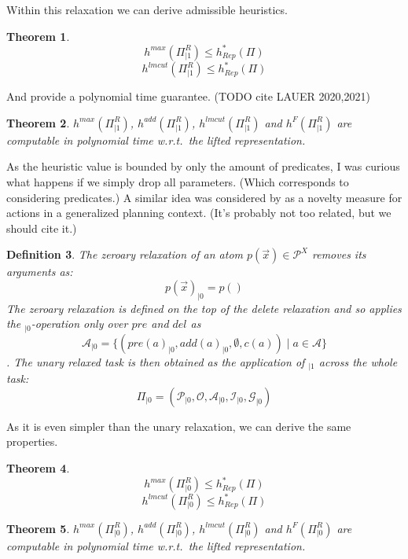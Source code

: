 \documentclass[twocolumn]{article}
\newcommand{\task}{\ensuremath{\Pi}\xspace}
\newcommand{\preds}{\ensuremath{\mathcal{P}}\xspace}
\newcommand{\acts}{\ensuremath{\mathcal{A}}\xspace}
\newcommand{\objects}{\ensuremath{\mathcal{O}}\xspace}
\newcommand{\init}{\ensuremath{\mathcal{I}}\xspace}
\newcommand{\goal}{\ensuremath{\mathcal{G}}\xspace}
\newcommand{\vars}{\ensuremath{X}\xspace}
\newcommand{\someVar}{\ensuremath{x}\xspace}
\newcommand{\atoms}{\ensuremath{\preds^{\vars}}\xspace}
\newcommand{\someAtom}{\ensuremath{p(\vec{\someVar})}\xspace}
\newcommand{\somePred}{\ensuremath{p}\xspace}
\newcommand{\prename}{\ensuremath{pre}\xspace}
\newcommand{\addname}{\ensuremath{add}\xspace}
\newcommand{\delname}{\ensuremath{del}\xspace}
\newcommand{\pre}[1]{\ensuremath{\prename(#1)}\xspace}
\newcommand{\add}[1]{\ensuremath{\addname(#1)}\xspace}
\newcommand{\cost}[1]{\ensuremath{c(#1)}\xspace}
\newcommand{\someAct}{\ensuremath{a}\xspace}
\newcommand{\optimalHeuristic}{\ensuremath{h^{*}_{Rep}}\xspace}
\newcommand{\unary}[1]{\ensuremath{#1_{|1}}\xspace}
\newcommand{\zeroary}[1]{\ensuremath{#1_{|0}}\xspace}
\newtheorem{theorem}{Theorem}
\newtheorem{definition}[theorem]{Definition}
\begin{document}
	Within this relaxation we can derive admissible heuristics.
	
	\begin{theorem}
		$$
			h^{max}(\unary{\task^{R}}) \leq \optimalHeuristic(\task)
		$$
		$$
		h^{lmcut}(\unary{\task^{R}}) \leq \optimalHeuristic(\task)
		$$
	\end{theorem}
	
	And provide a polynomial time guarantee. (TODO cite LAUER 2020,2021)
	
	\begin{theorem}
		$
		h^{max}(\unary{\task^{R}})
		$,
		$
		h^{add}(\unary{\task^{R}})
		$,
		$
		h^{lmcut}(\unary{\task^{R}})
		$
		and 
		$
		h^{F}(\unary{\task^{R}})
		$
		are computable in polynomial time w.r.t.\ the lifted representation.
	\end{theorem}
	
	As the heuristic value is bounded by only the amount of predicates, I was curious what happens if we simply drop all parameters. 
	(Which corresponds to considering predicates.)
	A similar idea was considered by \cite{lei:etal:socs-23} as a novelty measure for actions in a generalized planning context.
	(It's probably not too related, but we should cite it.)
	
	\begin{definition}
		The zeroary relaxation of an atom $\someAtom \in \atoms$ removes its arguments as:
		$$
		\zeroary{\someAtom} =  \somePred()
		$$
		The zeroary relaxation is defined on the top of the delete relaxation and so applies the {$\zeroary{}$}-operation only over \prename and \delname as
		$$
		\zeroary{\acts} = \{(\zeroary{\pre{\someAct}}, \zeroary{\add{\someAct}}, \emptyset, \cost{\someAct}) \mid \someAct \in \acts\}
		$$.
		The unary relaxed task is then obtained as the application of $\unary{}$ across the whole task:
		$$
		\zeroary{\task} = (\zeroary{\preds}, \objects, \zeroary{\acts}, \zeroary{\init}, \zeroary{\goal})
		$$
	\end{definition}
	
	As it is even simpler than the unary relaxation, we can derive the same properties.
	
	\begin{theorem}
		$$
		h^{max}(\zeroary{\task^{R}}) \leq \optimalHeuristic(\task)
		$$
		$$
		h^{lmcut}(\zeroary{\task^{R}}) \leq \optimalHeuristic(\task)
		$$
	\end{theorem}
	
	\begin{theorem}
		$
		h^{max}(\zeroary{\task^{R}})
		$,
		$
		h^{add}(\zeroary{\task^{R}})
		$,
		$
		h^{lmcut}(\zeroary{\task^{R}})
		$
		and 
		$
		h^{F}(\zeroary{\task^{R}})
		$
		are computable in polynomial time w.r.t.\ the lifted representation.
	\end{theorem}
	
\end{document}
